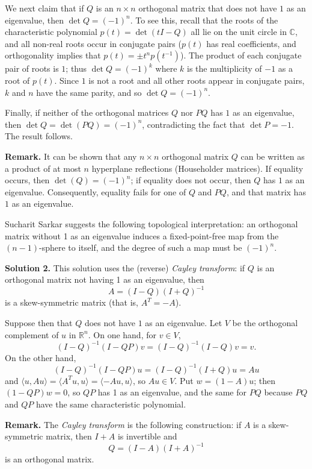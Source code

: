 \documentclass[amssymb,twocolumn,pra,10pt,aps]{revtex4-1}
\begin{document}
\begin{itemize}
We next claim that if $Q$ is an $n\times n$ orthogonal matrix that does not have $1$ as an eigenvalue, then $\det Q = (-1)^n$. To see this, recall that the roots of the characteristic polynomial $p(t) = \det(tI-Q)$ all lie on the unit circle in $\mathbb{C}$, and all non-real roots occur in conjugate pairs ($p(t)$ has real coefficients, and orthogonality implies that $p(t) = \pm t^n p(t^{-1})$). The product of each conjugate pair of roots is $1$; thus $\det Q = (-1)^k$ where $k$ is the multiplicity of $-1$ as a root of $p(t)$. Since $1$ is not a root and all other roots appear in conjugate pairs, $k$ and $n$ have the same parity, and so $\det Q = (-1)^n$.

Finally, if neither of the orthogonal matrices $Q$ nor $PQ$ has $1$ as an eigenvalue, then $\det Q = \det(PQ) = (-1)^n$, contradicting the fact that $\det P = -1$. The result follows.

\noindent
\textbf{Remark.}
It can be shown that any $n \times n$ orthogonal matrix $Q$ can be written as a product of at most $n$ hyperplane reflections (Householder matrices). If equality occurs, then $\det(Q) = (-1)^n$;
if equality does not occur, then $Q$ has $1$ as an eigenvalue.
Consequently, equality fails for one of $Q$ and $PQ$, and that matrix has $1$ as an eigenvalue.

Sucharit Sarkar suggests the following topological interpretation: an orthogonal matrix without 1 as an eigenvalue
induces a fixed-point-free map from the $(n-1)$-sphere to itself, and the degree of such a map must be $(-1)^n$.

\noindent
\textbf{Solution 2.}
This solution uses the (reverse) \emph{Cayley transform}: if $Q$ is an orthogonal matrix not having 1 as an eigenvalue, then
\[
A = (I-Q)(I+Q)^{-1}
\]
is a skew-symmetric matrix (that is, $A^T = -A$).

Suppose then that $Q$ does not have $1$ as an eigenvalue.
Let $V$ be the orthogonal complement of $u$ in $\mathbb{R}^n$. On one hand, for $v \in V$,
\[
(I-Q)^{-1} (I - QP) v = (I-Q)^{-1} (I-Q)v = v.
\]
On the other hand,
\[
(I-Q)^{-1} (I - QP) u = (I-Q)^{-1} (I+Q)u = Au
\]
and $\langle u, Au \rangle = \langle A^T u, u \rangle
= \langle -Au, u \rangle$, so $Au \in V$.
Put $w = (1-A)u$; then $(1-QP)w = 0$, so $QP$ has 1 as an eigenvalue, and the same for $PQ$ because $PQ$ and $QP$ have the same characteristic polynomial.

\noindent
\textbf{Remark.}
The \emph{Cayley transform} is the following construction: if $A$ is a skew-symmetric matrix,
then $I+A$ is invertible and
\[
Q = (I-A)(I+A)^{-1}
\]
is an orthogonal matrix.


\end{itemize}
\end{document}
